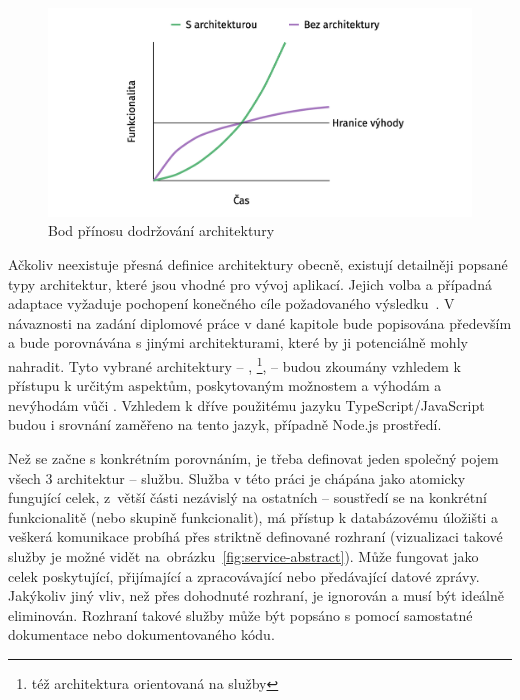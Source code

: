 \begin{figure}[htbp]
   \centering
   \includegraphics[max width=\textwidth]{assets/architecture-line}
   \caption[Bod přínosu dodržování architektury]{Bod přínosu dodržování architektury~\cite{archoworthit}}\label{fig:architecture-line}
\end{figure}


Ačkoliv neexistuje přesná definice architektury obecně, existují detailněji popsané typy architektur, které jsou vhodné pro vývoj aplikací.
Jejich volba a případná adaptace vyžaduje pochopení konečného cíle požadovaného výsledku~\cite{softarch}.
V návaznosti na zadání diplomové práce v dané kapitole bude popisována především  a bude porovnávána s jinými architekturami, které by ji potenciálně mohly nahradit.
Tyto vybrané architektury – , \footnote{též architektura orientovaná na služby},  – budou zkoumány vzhledem k přístupu k určitým aspektům, poskytovaným možnostem a výhodám a nevýhodám vůči .
Vzhledem k dříve použitému jazyku TypeScript/JavaScript budou i srovnání zaměřeno na tento jazyk, případně Node.js prostředí.


Než se začne s konkrétním porovnáním, je třeba definovat jeden společný pojem všech 3 architektur – službu.
Služba v této práci je chápána jako atomicky fungující celek, z~větší části nezávislý na ostatních – soustředí se na konkrétní funkcionalitě (nebo skupině funkcionalit), má přístup k databázovému úložišti a veškerá komunikace probíhá přes striktně definované rozhraní (vizualizaci takové služby je možné vidět na~obrázku~\ref{fig:service-abstract}).
Může fungovat jako celek poskytující, přijímající a zpracovávající nebo předávající datové zprávy.
Jakýkoliv jiný vliv, než přes dohodnuté rozhraní, je ignorován a musí být ideálně eliminován.
Rozhraní takové služby může být popsáno s pomocí samostatné dokumentace nebo dokumentovaného kódu.


